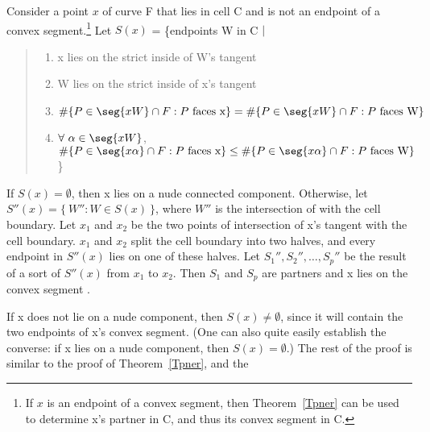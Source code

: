 \begin{theorem}
\label{Tps}
Consider a point $x$ of curve F that lies in cell C and is not an endpoint of a 
convex segment.\footnote{If $x$ is an endpoint of a convex segment,
	then Theorem~\ref{Tpner} can be used to determine x's partner in C, 
	and thus its convex segment in C.}
Let $S(x)$ = \{endpoints W in C $\mid$
\begin{quote}
\begin{enumerate}
\item x lies on the strict inside of W's tangent
\item W lies on the strict inside of x's tangent 
\item \mbox{$\#\{P \in\seg{xW}\cap F: P \mbox{ faces x}\} =
\#\{P \in \seg{xW}\cap F: P \mbox{ faces W} \}$}
\item $\forall\ \alpha \in \seg{xW}$,
$\#\{P \in\seg{x\alpha}\cap F: P \mbox{ faces x}\} \leq
\#\{P \in \seg{x\alpha}\cap F: P \mbox{ faces W}\} $
\}
\end{enumerate}
\end{quote}
%
If $S(x) = \emptyset$, then x lies on a nude connected component. 
Otherwise, let $S''(x) = \{\ W'' : W \in S(x)\ \}$, where $W''$ is the intersection 
of  with the cell boundary.
Let $x_{1}$ and $x_{2}$ be the two points of intersection of x's tangent with the
cell boundary.
$x_{1}$ and $x_{2}$ split the cell boundary into two halves,
and every endpoint in $S''(x)$ lies on one of these halves.
Let $S_{1}'',S_{2}'',\ldots,S_{p}''$ be the result of a sort of $S''(x)$ 
from $x_{1}$ to $x_{2}$.
Then $S_{1}$ and $S_{p}$ are partners and x lies on the convex segment 
.
\end{theorem}
%
If x does not lie on a nude component, then $S(x) \neq \emptyset$, since it will 
contain the two endpoints of x's convex segment.
(One can also quite easily establish the converse: if x lies on a nude 
component, then $S(x) =  \emptyset$.)
%
%
The rest of the proof is similar to the proof of Theorem~\ref{Tpner}, and the 
